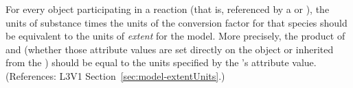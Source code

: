 For every \Species object participating in a reaction (that is, referenced
by a \SpeciesReference or \ModifierSpeciesReference), the units of
substance times the units of the conversion factor for that species should
be equivalent to the units of \emph{extent} for the model.  More precisely,
the product of  and  (whether
those attribute values are set directly on the \Species object or inherited
from the \Model) should be equal to the units specified by the \Model's
 attribute value.  (References: L3V1
Section~\ref{sec:model-extentUnits}.)
